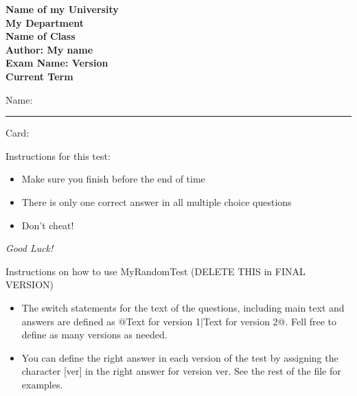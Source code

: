 \documentclass[10pt]{examdesign}
\newcommand{\myversion}{} %
\begin{document}
\begin{examtop}
	
\begin{center}
    \textbf{\Large  Name of my University} \\
    \textbf{\Large  My Department} \vspace{0.5cm}  \\   
    \textbf{\Large  Name of Class} \\
	\textbf{\Large  Author: My name} \\
    \textbf{\Large Exam Name: Version \myversion } \\ 
    \textbf{\Large Current Term}
 \end{center}

\vspace{1cm}
Name: \rule{4in}{.4pt}  \quad  \noindent Card:\enspace\hrulefill
 

\vspace{1cm}

\small

\begin{framed}

Instructions for this test:

\begin{itemize}
	
	\item Make sure you finish before the end of time
	
	\item There is only one correct answer in all multiple choice questions

	\item Don't cheat!
	
\end{itemize}

\vspace{0.5cm}

{\large \emph{Good Luck!}}
\end{framed}

\begin{framed}
	Instructions on how to use MyRandomTest (DELETE THIS in FINAL VERSION)
	\begin{itemize}
		
		\item The switch statements for the text of the questions, including main text and answers are defined as @{Text for version 1}|{Text for version 2}@.  Fell free to define as many versions as needed.
		
		\item You can define the right answer in each version of the test by assigning the character [ver] in the right answer for version ver. See the rest of the file for examples. 
		
		
	\end{itemize}

\end{framed}

\end{examtop}
\end{document}
